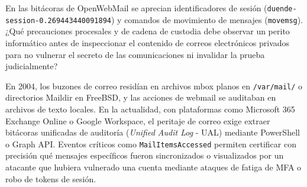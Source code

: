 \begin{retoforense}
En las bitácoras de OpenWebMail se aprecian identificadores de sesión (\texttt{duende-session-0.269443440091894}) y comandos de movimiento de mensajes (\texttt{movemsg}). ¿Qué precauciones procesales y de cadena de custodia debe observar un perito informático antes de inspeccionar el contenido de correos electrónicos privados para no vulnerar el secreto de las comunicaciones ni invalidar la prueba judicialmente?
\end{retoforense}

\begin{perspectiva20}
En 2004, los buzones de correo residían en archivos mbox planos en \texttt{/var/mail/} o directorios Maildir en FreeBSD, y las acciones de webmail se auditaban en archivos de texto locales. En la actualidad, con plataformas como Microsoft 365 Exchange Online o Google Workspace, el peritaje de correo exige extraer bitácoras unificadas de auditoría (\textit{Unified Audit Log} - UAL) mediante PowerShell o Graph API. Eventos críticos como \texttt{MailItemsAccessed} permiten certificar con precisión qué mensajes específicos fueron sincronizados o visualizados por un atacante que hubiera vulnerado una cuenta mediante ataques de fatiga de MFA o robo de tokens de sesión.
\end{perspectiva20}

